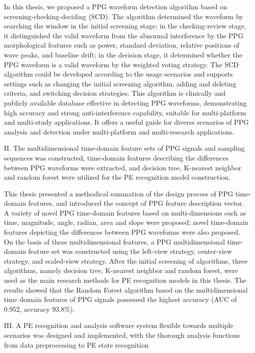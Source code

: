 In this thesis, we proposed a PPG waveform detection algorithm based on screening-checking-deciding (SCD). 
The algorithm determined the waveform by searching the window in the initial screening stage; in the checking-review stage, 
it distinguished the valid waveform from the abnormal interference by the PPG morphological features such as power, standard deviation, 
relative positions of wave peaks, and baseline drift; in the decision stage, it determined whether the PPG waveform 
is a valid waveform by the weighted voting strategy. 
The SCD algorithm could be developed according to the usage scenarios and supports settings such as 
changing the initial screening algorithm, adding and deleting criteria, 
and switching decision strategies. 
This algorithm is clinically and publicly available database effective in detecting PPG waveforms, 
demonstrating high accuracy and strong anti-interference capability, suitable for multi-platform and multi-study applications.
It offers a useful guide for diverse scenarios of PPG analysis and detection under multi-platform and multi-research applications.

II. The multidimensional time-domain feature sets of PPG signals and sampling sequences was constructed, 
time-domain features describing the differences between PPG waveforms were extracted,
and decision tree, K-nearest neighbor and random forest were utilized for the PE recognition model construction.

This thesis presented a methodical summation of the design process of PPG time-domain features, 
and introduced the concept of PPG feature description vector.
A variety of novel PPG time-domain features based on multi-dimensions such as time, magnitude, angle, radian, area and slope were proposed; 
novel time-domain features depicting the differences between PPG waveforms were also proposed.
On the basis of these multidimensional features, a PPG multidimensional time-domain feature set was constructed 
using the left-view strategy, center-view strategy, and scaled-view strategy.
After the initial screening of algorithms, three algorithms, namely decision tree, K-nearest neighbor and random forest, 
were used as the main research methods for PE recognition models in this thesis.
The results showed that the Random Forest algorithm based on the multidimensional time domain features of PPG signals 
possessed the highest accuracy (AUC of 0.952, accuracy 93.8\%).


III. A PE recognition and analysis software system flexible towards multiple scenarios was designed and implemented, 
with the thorough analysis functions from data preprocessing to PE state recognition

